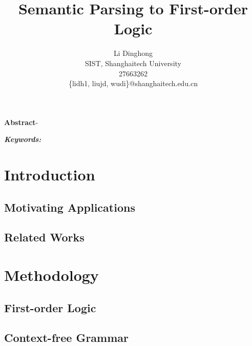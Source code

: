 \documentclass{article}
\title{Semantic Parsing to First-order Logic}
\author{Li Dinghong\\
SIST, Shanghaitech University\\
27663262\\
\{lidh1, liujd, wudi\}@shanghaitech.edu.cn
}
\begin{document}
{
	\newpage
	\maketitle

	\textbf{Abstract}-{}

	\vspace{5pt}
	\textbf{\emph{Keywords:}} {}

	\tableofcontents
}

\section{Introduction}{
	\subsection{Motivating Applications}{}

	\subsection{Related Works}{}
}

\section{Methodology}{
	\subsection{First-order Logic}{}

	\subsection{Context-free Grammar}{}
}

\section{}



\citation
\end{document}
